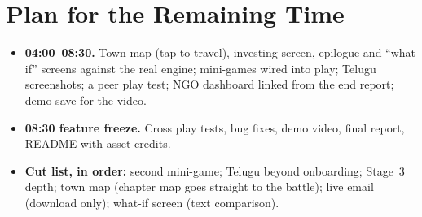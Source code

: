 \documentclass[10pt,a4paper]{article}
\begin{document}
\section{Plan for the Remaining Time}
\begin{itemize}
  \item \textbf{04:00--08:30.} Town map (tap-to-travel), investing screen, epilogue and ``what if'' screens against the real engine; mini-games wired into play; Telugu screenshots; a peer play test; NGO dashboard linked from the end report; demo save for the video.
  \item \textbf{08:30 feature freeze.} Cross play tests, bug fixes, demo video, final report, README with asset credits.
  \item \textbf{Cut list, in order:} second mini-game; Telugu beyond onboarding; Stage~3 depth; town map (chapter map goes straight to the battle); live email (download only); what-if screen (text comparison).
\end{itemize}
\end{document}
